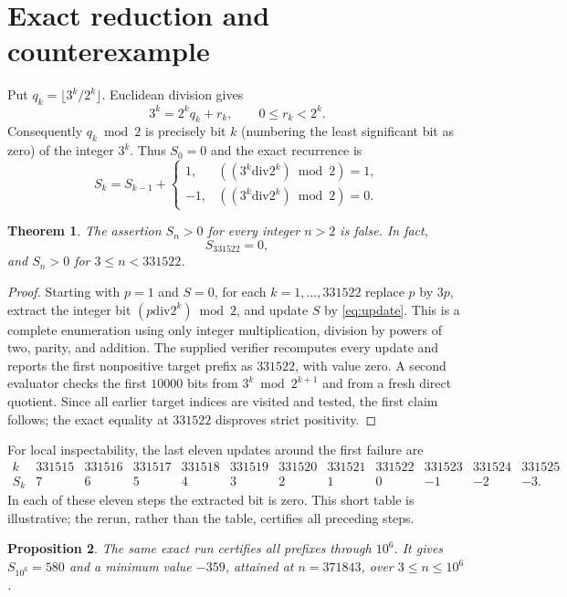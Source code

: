 \documentclass[10pt]{amsart}
\newtheorem{theorem}{Theorem}
\newtheorem{proposition}[theorem]{Proposition}
\begin{document}
\section{Exact reduction and counterexample}
Put $q_k=\lfloor3^k/2^k\rfloor$. Euclidean division gives
\[
 3^k=2^kq_k+r_k,\qquad 0\leq r_k<2^k.
\]
Consequently $q_k\bmod2$ is precisely bit $k$ (numbering the least
significant bit as zero) of the integer $3^k$. Thus $S_0=0$ and the exact
recurrence is
\begin{equation}\label{eq:update}
 S_k=S_{k-1}+\begin{cases}1,&((3^k\mathbin{\mathrm{div}}2^k)\bmod2)=1,\\
 -1,&((3^k\mathbin{\mathrm{div}}2^k)\bmod2)=0.
 \end{cases}
\end{equation}
\begin{theorem}\label{thm:counterexample}
The assertion $S_n>0$ for every integer $n>2$ is false. In fact,
\[
 S_{331522}=0,
\]
and $S_n>0$ for $3\leq n<331522$.
\end{theorem}
\begin{proof}
Starting with $p=1$ and $S=0$, for each $k=1,\ldots,331522$ replace
$p$ by $3p$, extract the integer bit $(p\mathbin{\mathrm{div}}2^k)\bmod2$,
and update $S$ by \eqref{eq:update}. This is a complete enumeration using
only integer multiplication, division by powers of two, parity, and addition.
The supplied verifier recomputes every update and reports the first
nonpositive target prefix as $331522$, with value zero. A second evaluator
checks the first $10000$ bits from $3^k\bmod2^{k+1}$ and from a fresh direct
quotient. Since all earlier target indices are visited and tested, the first
claim follows; the exact equality at $331522$ disproves strict positivity.
\end{proof}

For local inspectability, the last eleven updates around the first failure are
\begingroup\scriptsize\setlength{\arraycolsep}{2.2pt}
\[
\begin{array}{c|rrrrrrrrrrr}
k&331515&331516&331517&331518&331519&331520&331521&331522&331523&331524&331525\\\hline
S_k&7&6&5&4&3&2&1&0&-1&-2&-3.
\end{array}
\]
\endgroup
In each of these eleven steps the extracted bit is zero. This short table is
illustrative; the rerun, rather than the table, certifies all preceding steps.

\begin{proposition}
The same exact run certifies all prefixes through $10^6$. It gives
$S_{10^6}=580$ and a minimum value $-359$, attained at $n=371843$, over
$3\leq n\leq10^6$.
\end{proposition}
\end{document}
